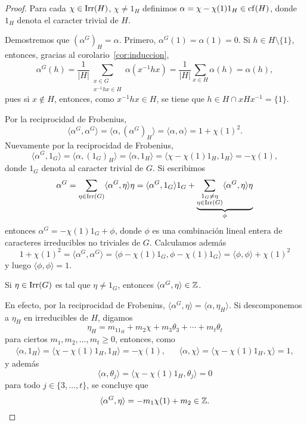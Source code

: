 \begin{proof}
  Para cada $\chi\in\operatorname{Irr}(H)$, $\chi\ne1_H$ definimos
  $\alpha=\chi-\chi(1)1_H\in\operatorname{cf}(H)$, donde $1_H$ denota el caracter trivial de $H$. 

  Demostremos que $(\alpha^G)_H=\alpha$.
  Primero, $\alpha^G(1)=\alpha(1)=0$. Si $h\in H\setminus\{1\}$, entonces, gracias al corolario~\ref{cor:induccion}, 
  \[
    \alpha^G(h)=\frac{1}{|H|}\sum_{\substack{x\in G\\x^{-1}hx\in H}}\alpha(x^{-1}hx)
    =\frac{1}{|H|}\sum_{x\in H}\alpha(h)=\alpha(h),
  \]
  pues si $x\not\in H$, entonces, como $x^{-1}hx\in H$, se tiene que $h\in H\cap xHx^{-1}=\{1\}$.

  Por la reciprocidad de Frobenius, 
  \begin{equation}
    \label{eq:<a,a>=1+chi2}
    \langle\alpha^G,\alpha^G\rangle
    =\langle\alpha,(\alpha^G)_H\rangle=\langle\alpha,\alpha\rangle
    =1+\chi(1)^2.
  \end{equation}
  Nuevamente por la reciprocidad de Frobenius, 
  \[
  \langle\alpha^G,1_G\rangle
  =\langle\alpha,(1_G)_H\rangle
  =\langle\alpha,1_H\rangle
  =\langle\chi-\chi(1)1_H,1_H\rangle
  =-\chi(1),
  \]
  donde $1_G$ denota al caracter trivial de $G$. Si escribimos
  \[
  \alpha^G=\sum_{\eta\in\operatorname{Irr}(G)}\langle\alpha^G,\eta\rangle\eta
  =\langle\alpha^G,1_G\rangle1_G+\underbrace{\sum_{\substack{1_G\ne\eta\\\eta\in\operatorname{Irr}(G)}}\langle\alpha^G,\eta\rangle\eta}_{\phi}
  \]
  entonces $\alpha^G=-\chi(1)1_G+\phi$, donde $\phi$ es una 
  combinación lineal entera de caracteres irreducibles no triviales de $G$. 
  Calculamos además
  \[
  1+\chi(1)^2=\langle\alpha^G,\alpha^G\rangle
  =\langle\phi-\chi(1)1_G,\phi-\chi(1)1_G\rangle
  =\langle\phi,\phi\rangle+\chi(1)^2
  \]
  y luego $\langle\phi,\phi\rangle=1$. 
  
  \begin{claim}
  Si $\eta\in\operatorname{Irr}(G)$ es tal que $\eta\ne 1_G$, entonces $\langle\alpha^G,\eta\rangle\in\mathbb{Z}$. 
  \end{claim}
  
  En efecto, por la reciprocidad de Frobenius, $\langle\alpha^G,\eta\rangle=\langle\alpha,\eta_H\rangle$. 
  Si descomponemos a $\eta_H$ en irreducibles de $H$, digamos
  \[
  \eta_H=m_11_H+m_2\chi+m_3\theta_3+\cdots+m_t\theta_t
  \]
  para ciertos $m_1,m_2,\dots,m_t\geq0$, 
  entonces, como
  \begin{align*}
  \langle\alpha,1_H\rangle=\langle\chi-\chi(1)1_H,1_H\rangle=-\chi(1),
  &&\langle\alpha,\chi\rangle=\langle\chi-\chi(1)1_H,\chi\rangle=1,
  \end{align*}
  y además 
  \[
  \langle\alpha,\theta_j\rangle=\langle\chi-\chi(1)1_H,\theta_j\rangle=0
  \]
  para todo $j\in\{3,\dots,t\}$, se concluye que
  \[
  \langle\alpha^G,\eta\rangle=-m_1\chi(1)+m_2\in\mathbb{Z}.
  \]
  

\end{proof}
